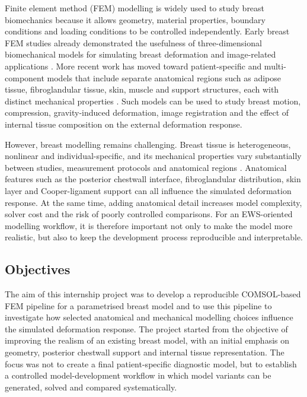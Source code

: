 Finite element method (FEM) modelling is widely used to study breast biomechanics because it allows geometry, material properties, boundary conditions and loading conditions to be controlled independently. Early breast FEM studies already demonstrated the usefulness of three-dimensional biomechanical models for simulating breast deformation and image-related applications \cite{Samani2001, Hsu2011}. More recent work has moved toward patient-specific and multi-component models that include separate anatomical regions such as adipose tissue, fibroglandular tissue, skin, muscle and support structures, each with distinct mechanical properties \cite{Samani2001, Hsu2011, Chen2024, Mazier2024}. Such models can be used to study breast motion, compression, gravity-induced deformation, image registration and the effect of internal tissue composition on the external deformation response.

However, breast modelling remains challenging. Breast tissue is heterogeneous, nonlinear and individual-specific, and its mechanical properties vary substantially between studies, measurement protocols and anatomical regions \cite{Ramiao2016, Goodbrake2022, Galbreath2025, Teixeira2023}. Anatomical features such as the posterior chestwall interface, fibroglandular distribution, skin layer and Cooper-ligament support can all influence the simulated deformation response. At the same time, adding anatomical detail increases model complexity, solver cost and the risk of poorly controlled comparisons. For an EWS-oriented modelling workflow, it is therefore important not only to make the model more realistic, but also to keep the development process reproducible and interpretable.

\subsection{Objectives}

The aim of this internship project was to develop a reproducible COMSOL-based FEM pipeline for a parametrised breast model and to use this pipeline to investigate how selected anatomical and mechanical modelling choices influence the simulated deformation response. The project started from the objective of improving the realism of an existing breast model, with an initial emphasis on geometry, posterior chestwall support and internal tissue representation. The focus was not to create a final patient-specific diagnostic model, but to establish a controlled model-development workflow in which model variants can be generated, solved and compared systematically.

